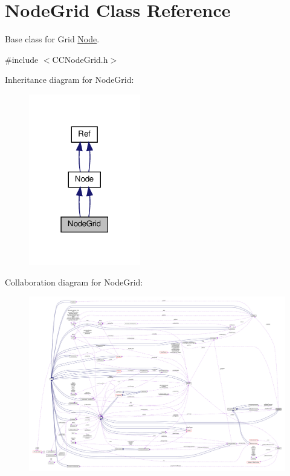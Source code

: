 \hypertarget{classNodeGrid}{}\section{Node\+Grid Class Reference}
\label{classNodeGrid}


Base class for Grid \hyperlink{classNode}{Node}.  




{\ttfamily \#include $<$C\+C\+Node\+Grid.\+h$>$}



Inheritance diagram for Node\+Grid\+:
\nopagebreak
\begin{figure}[H]
\begin{center}
\leavevmode
\includegraphics[width=138pt]{classNodeGrid__inherit__graph}
\end{center}
\end{figure}


Collaboration diagram for Node\+Grid\+:
\nopagebreak
\begin{figure}[H]
\begin{center}
\leavevmode
\includegraphics[width=350pt]{classNodeGrid__coll__graph}
\end{center}
\end{figure}

